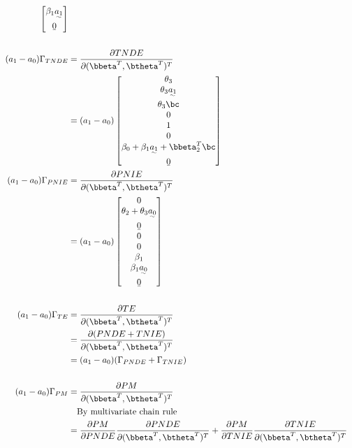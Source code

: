 \documentclass[dvipdfmx,10pt]{article}
\begin{document}
\begin{align*}
\begin{bmatrix}
      \beta_{1}\uwave{a_{1}}\\
      \b0\\
    \end{bmatrix}\\
  \\
  (a_{1}-a_{0})\Gamma_{TNDE}
  &= \frac{\partial TNDE}{\partial (\bbeta^{T},\btheta^{T})^{T}}\\
  &= (a_{1}-a_{0})
    \begin{bmatrix}
      \theta_{3}\\
      \theta_{3}\uwave{a_{1}}\\
      \theta_{3}\bc\\
      0\\
      1\\
      0\\
      \beta_{0} + \beta_{1}\uwave{a_{1}} + \bbeta_{2}^{T}\bc\\
      \b0\\
    \end{bmatrix}\\
  (a_{1}-a_{0})\Gamma_{PNIE}
  &= \frac{\partial PNIE}{\partial (\bbeta^{T},\btheta^{T})^{T}}\\
  &= (a_{1}-a_{0})
    \begin{bmatrix}
      0\\
      \theta_{2} + \theta_{3}\uwave{a_{0}}\\
      \b0\\
      0\\
      0\\
      \beta_{1}\\
      \beta_{1}\uwave{a_{0}}\\
      \b0\\
    \end{bmatrix}\\
  \\
  (a_{1}-a_{0})\Gamma_{TE}
  &= \frac{\partial TE}{\partial (\bbeta^{T},\btheta^{T})^{T}}\\
  &= \frac{\partial (PNDE+TNIE)}{\partial (\bbeta^{T},\btheta^{T})^{T}}\\
  &= (a_{1}-a_{0})(\Gamma_{PNDE} + \Gamma_{TNIE})\\
  \\
  (a_{1}-a_{0})\Gamma_{PM}
  &= \frac{\partial PM}{\partial (\bbeta^{T},\btheta^{T})^{T}}\\
  &~~~\text{By multivariate chain rule}\\
  &= \frac{\partial PM}{\partial PNDE}\frac{\partial PNDE}{\partial (\bbeta^{T},\btheta^{T})^{T}} + \frac{\partial PM}{\partial TNIE}\frac{\partial TNIE}{\partial (\bbeta^{T},\btheta^{T})^{T}}\\

\end{align*}
\end{document}
